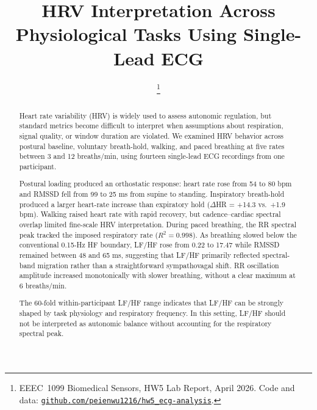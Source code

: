 \documentclass[conference]{IEEEtran}
\begin{document}
\title{HRV Interpretation Across Physiological Tasks Using Single-Lead ECG}

\author{
  \thanks{EEEC~1099 Biomedical Sensors, HW5 Lab Report, April 2026.
    Code and data: \href{https://github.com/peienwu1216/hw5_ecg-analysis}{\texttt{github.com/peienwu1216/hw5\_ecg-analysis}}.}
}

\maketitle

\begin{abstract}
Heart rate variability (HRV) is widely used to assess autonomic
regulation, but standard metrics become difficult to interpret when
assumptions about respiration, signal quality, or window duration are
violated. We examined HRV behavior across postural baseline, voluntary
breath-hold, walking, and paced breathing at five rates between 3 and
12 breaths/min, using fourteen single-lead ECG recordings from one
participant.

Postural loading produced an orthostatic response: heart rate rose from
54 to 80 bpm and RMSSD fell from 99 to 25 ms from supine to standing.
Inspiratory breath-hold produced a larger heart-rate increase than
expiratory hold ($\Delta$HR = +14.3 vs.\ +1.9 bpm). Walking raised heart
rate with rapid recovery, but cadence--cardiac spectral overlap limited
fine-scale HRV interpretation. During paced breathing, the RR spectral
peak tracked the imposed respiratory rate ($R^{2}=0.998$). As breathing
slowed below the conventional 0.15-Hz HF boundary, LF/HF rose from 0.22
to 17.47 while RMSSD remained between 48 and 65 ms, suggesting that
LF/HF primarily reflected spectral-band migration rather than a
straightforward sympathovagal shift. RR oscillation amplitude increased
monotonically with slower breathing, without a clear maximum at 6 breaths/min.

The 60-fold within-participant LF/HF range indicates that LF/HF can be
strongly shaped by task physiology and respiratory frequency. In this
setting, LF/HF should not be interpreted as autonomic balance without
accounting for the respiratory spectral peak.
\end{abstract}
\end{document}
